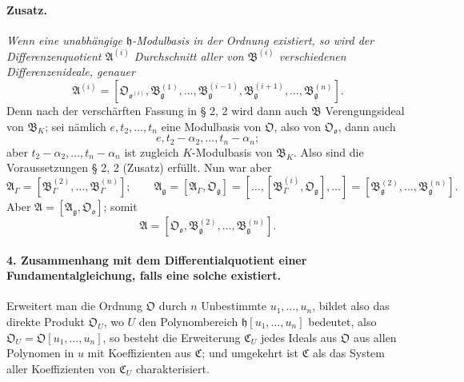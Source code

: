 \paragraph{Zusatz.}
\emph{Wenn eine unabhängige $\mathfrak h$-Modulbasis in der Ordnung existiert, so wird der Differenzenquotient $\mathfrak A^{(i)}$ Durchschnitt aller von $\mathfrak B^{(i)}$ verschiedenen Differenzenideale, genauer}
\[
\mathfrak A^{(i)}=
[\mathfrak O_{\mathfrak o^{(i)}},
\mathfrak B_{\mathfrak g}^{(1)},\ldots,
\mathfrak B_{\mathfrak g}^{(i-1)},
\mathfrak B_{\mathfrak g}^{(i+1)},\ldots,
\mathfrak B_{\mathfrak g}^{(n)}].
\]
Denn nach der verschärften Fassung in § 2, 2 wird dann auch $\mathfrak B$ Verengungsideal von $\mathfrak B_K$; sei nämlich $e,t_2,\ldots,t_n$ eine Modulbasis von $\mathfrak O$, also von $\mathfrak O_{\mathfrak o}$, dann auch
\[
e,t_2-\alpha_2,\ldots,t_n-\alpha_n;
\]
aber $t_2-\alpha_2,\ldots,t_n-\alpha_n$ ist zugleich $K$-Modulbasis von $\mathfrak B_K$. Also sind die Voraussetzungen § 2, 2 (Zusatz) erfüllt. Nun war aber
\[
\mathfrak A_\Gamma=[\mathfrak B_\Gamma^{(2)},\ldots,\mathfrak B_\Gamma^{(n)}];
\qquad
\mathfrak A_\mathfrak g=[\mathfrak A_\Gamma,\mathfrak O_\mathfrak g]
=[\ldots,[\mathfrak B_\Gamma^{(i)},\mathfrak O_\mathfrak g],\ldots]
=[\mathfrak B_\mathfrak g^{(2)},\ldots,\mathfrak B_\mathfrak g^{(n)}].
\]
Aber $\mathfrak A=[\mathfrak A_\mathfrak g,\mathfrak O_{\mathfrak o}]$; somit
\[
\mathfrak A=[\mathfrak O_{\mathfrak o},\mathfrak B_\mathfrak g^{(2)},\ldots,\mathfrak B_\mathfrak g^{(n)}].
\]

\paragraph{4. Zusammenhang mit dem Differentialquotient einer Fundamentalgleichung, falls eine solche existiert.}
Erweitert man die Ordnung $\mathfrak O$ durch $n$ Unbestimmte $u_1,\ldots,u_n$, bildet also das direkte Produkt $\mathfrak O_U$, wo $U$ den Polynombereich $\mathfrak h[u_1,\ldots,u_n]$ bedeutet, also $\mathfrak O_U=\mathfrak O[u_1,\ldots,u_n]$, so besteht die Erweiterung $\mathfrak C_U$ jedes Ideals aus $\mathfrak O$ aus allen Polynomen in $u$ mit Koeffizienten aus $\mathfrak C$; und umgekehrt ist $\mathfrak C$ als das System aller Koeffizienten von $\mathfrak C_U$ charakterisiert.

